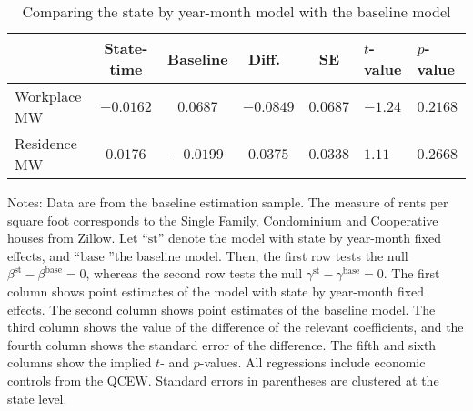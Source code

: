 \begin{table}[hbt!]
    \centering
    \caption{Comparing the state by year-month model with the baseline model}
    \label{tab:test_stateFE}

    \begin{tabular}{@{}lcccc@{}}
        \toprule
                     & State-time & Baseline & Diff.\ & SE      & $t$-value & $p$-value \\ \midrule
        Workplace MW & $-0.0162$      & $0.0687$    &  $-0.0849$ & $0.0687$   & $-1.24$     & $0.2168$ \\
        Residence MW & $0.0176$      & $-0.0199$    &  $0.0375$ & $0.0338$   & $1.11$     & $0.2668$ \\ \bottomrule
    \end{tabular}

    \begin{minipage}{.95\textwidth} \footnotesize
        \vspace{2mm}
        Notes: 
        Data are from the baseline estimation sample.
        The measure of rents per square foot corresponds to the Single Family, 
        Condominium and Cooperative houses from Zillow.
        Let ``$\text{st}$'' denote the model with state by year-month fixed effects,
        and ``$\text{base}$ ''the baseline model.
        Then, the first row tests the null $\beta^{\text{st}} - \beta^{\text{base}} = 0$,
        whereas the second row tests the null $\gamma^{\text{st}} - \gamma^{\text{base}} = 0$.
        The first column shows point estimates of the model with state by year-month 
        fixed effects.
        The second column shows point estimates of the baseline model.
        The third column shows the value of the difference of the relevant coefficients,
        and the fourth column shows the standard error of the difference.
        The fifth and sixth columns show the implied $t$- and $p$-values.
        All regressions include economic controls from the QCEW.
        Standard errors in parentheses are clustered at the state level.
    \end{minipage}
\end{table}

